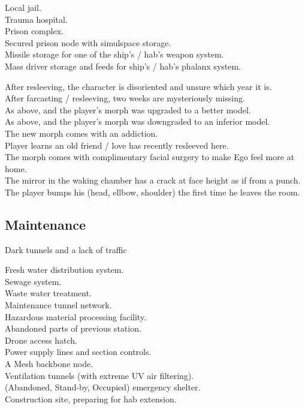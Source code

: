 \documentclass[a4]{article}
\begin{document}
Local jail.\\
Trauma hospital.\\
Prison complex.\\
Secured prison node with simulspace storage.\\
Missile storage for one of the ship's / hab's weapon system.\\
Mass driver storage and feeds for ship's / hab's phalanx system.\\
\stoptableone



\starttableone
After resleeving, the character is disoriented and unsure which year it is.\\
After farcasting / resleeving, two weeks are mysteriously missing.\\
As above, and the player's morph was upgraded to a better model.\\
As above, and the player's morph was downgraded to an inferior model.\\
The new morph comes with an addiction.\\
Player learns an old friend / love has recently resleeved here.\\
The morph comes with complimentary facial surgery to make Ego feel more at home.\\
The mirror in the waking chamber has a crack at face height as if from a punch.\\
The player bumps his (head, ellbow, shoulder) the first time he leaves the room.\\
\stoptableone





\subsection{Maintenance}

Dark tunnels and a lack of traffic 

\starttableone
Fresh water distribution system.\\
Sewage system.\\
Waste water treatment.\\
Maintenance tunnel network.\\
Hazardous material processing facility.\\
Abandoned parts of previous station.\\
Drone access hatch.\\
Power supply lines and section controls.\\
A Mesh backbone node.\\
Ventilation tunnels (with extreme UV air filtering).\\
(Abandoned, Stand-by, Occupied) emergency shelter.\\
Construction site, preparing for hab extension.\\
\stoptableone
\end{document}
